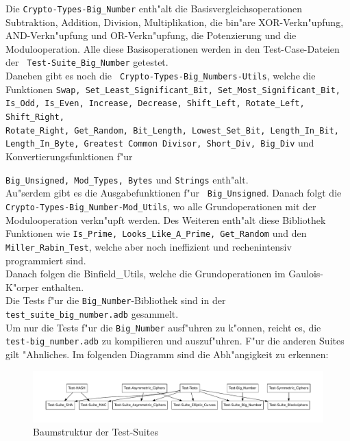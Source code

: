 Die {\tt Crypto-Types-Big\_Number} enth"alt die
Basisvergleichsoperationen Subtraktion, Addition, Division,
Multiplikation, die bin"are XOR-Verkn"upfung, AND-Verkn"upfung und
OR-Verkn"upfung, die Potenzierung und die Modulooperation.  Alle diese
Basisoperationen werden in den Test-Case-Dateien der {\tt
  Test-Suite\_Big\_Number} getestet.\\ Daneben gibt es noch die {\tt
  Crypto-Types-Big\_Numbers-Utils}, welche die Funktionen {\tt Swap,
  Set\_Least\_Significant\_Bit, Set\_Most\_Significant\_Bit, Is\_Odd,
  Is\_Even, Increase, Decrease, Shift\_Left, Rotate\_Left,
  Shift\_Right,\\ Rotate\_Right, Get\_Random, Bit\_Length,
  Lowest\_Set\_Bit, Length\_In\_Bit, Length\_In\_Byte, Greatest Common
  Divisor, Short\_Div, Big\_Div} und Konvertierungsfunktionen f"ur
{{\tt Big\_Unsigned, Mod\_Types, Bytes} und {\tt Strings}
  enth"alt.\\ Au"serdem gibt es die Ausgabefunktionen f"ur {\tt
    Big\_Unsigned}.  Danach folgt die {\tt
    Crypto-Types-Big\_Number-Mod\_Utils}, wo alle Grundoperationen mit
  der Modulooperation verkn"upft werden.  Des Weiteren enth"alt diese
  Bibliothek Funktionen wie {\tt Is\_Prime, Looks\_Like\_A\_Prime,
    Get\_Random} und den {\tt Miller\_Rabin\_Test}, welche aber noch
  ineffizient und rechenintensiv programmiert sind.\\ Danach folgen
  die Binfield\_Utils, welche die Grundoperationen im Gaulois-K"orper
  enthalten.\\

Die Tests f"ur die {\tt Big\_Number}-Bibliothek sind in der {\tt
  test\_suite\_big\_number.adb} gesammelt.\\ Um nur die Tests f"ur die
{\tt Big\_Number} ausf"uhren zu k"onnen, reicht es, die {\tt
  test-big\_number.adb} zu kompilieren und auszuf"uhren.  F"ur die
anderen Suites gilt "Ahnliches.  Im folgenden Diagramm sind die
Abh"angigkeit zu erkennen:

\begin{figure}[htp]
\centering
\includegraphics[width=\textwidth]{./images/graph_suites}
\caption{Baumstruktur der Test-Suites}
\label{fig:test-tree}
\end{figure}

}
